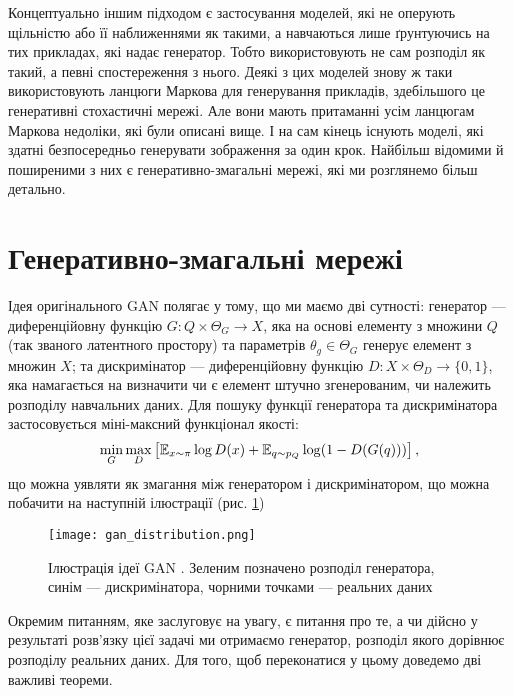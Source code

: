 Концептуально іншим підходом є застосування моделей, які
не оперують щільністю або її наближеннями як такими, а
навчаються лише ґрунтуючись на тих прикладах, які надає
генератор. Тобто використовують не сам розподіл як такий, а
певні спостереження з нього. Деякі з цих моделей знову ж таки
використовують ланцюги Маркова для генерування прикладів,
здебільшого це генеративні стохастичні мережі. Але вони мають
притаманні усім ланцюгам Маркова недоліки, які були описані вище.
І на сам кінець існують моделі, які здатні безпосередньо
генерувати зображення за один крок. Найбільш відомими й поширеними з них
є генеративно-змагальні мережі, які ми розглянемо більш детально.

\section{Генеративно-змагальні мережі}

Ідея оригінального GAN  \cite{pix2pix}
полягає у тому, що ми маємо дві сутності:
генератор --- диференційовну функцію $G: Q \times \Theta_G \rightarrow X$, яка
на основі елементу з множини $Q$ (так званого латентного простору)
та параметрів $\theta_g \in \Theta_G$
генерує елемент з множин $X$; та дискримінатор
--- диференційовну функцію $D: X \times \Theta_D \rightarrow \{0, 1\}$, яка
намагається на визначити чи є елемент штучно згенерованим, чи
належить розподілу навчальних даних. Для пошуку функції
генератора та дискримінатора застосовується міні-максний функціонал якості:
\begin{equation} \label{eq:gan_criterion}
    \min\limits_{G}\max\limits_{D} \left[
        \operatorname{\mathbb{E}}_{x \sim \pi} \log D(x) +
        \operatorname{\mathbb{E}}_{q \sim p_{Q}} \log (1 - D(G(q))) \right],
\end{equation}
що можна уявляти як змагання між генератором і дискримінатором,
що можна побачити на наступній ілюстрації (рис. \ref{fig:gan})

\begin{figure}[h]
    \centering
    \texttt{[image: gan\_distribution.png]}
    \caption{Ілюстрація ідеї GAN \cite{goodfellow2014generative}.
        Зеленим позначено розподіл генератора,
        синім --- дискримінатора,
        чорними точками --- реальних даних}
    \label{fig:gan}
\end{figure}

Окремим питанням, яке заслуговує на увагу, є питання про те,
а чи дійсно у результаті розв'язку цієї задачі ми отримаємо
генератор, розподіл якого дорівнює розподілу реальних даних.
Для того, щоб переконатися у цьому доведемо дві важливі теореми.

